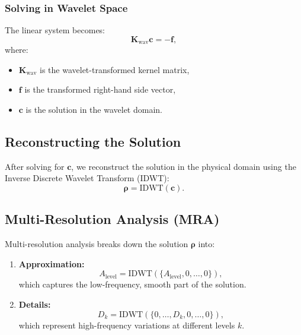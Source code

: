 \documentclass[12pt]{article}
\begin{document}
\subsubsection{Solving in Wavelet Space}
The linear system becomes:
\[
    \mathbf{K}_\text{wav} \mathbf{c} = -\mathbf{f},
\]
where:
\begin{itemize}
    \item \(\mathbf{K}_\text{wav}\) is the wavelet-transformed kernel matrix,
    \item \(\mathbf{f}\) is the transformed right-hand side vector,
    \item \(\mathbf{c}\) is the solution in the wavelet domain.
\end{itemize}

\subsection{Reconstructing the Solution}
After solving for \(\mathbf{c}\), we reconstruct the solution in the physical domain using the Inverse Discrete Wavelet Transform (IDWT):
\[
    \boldsymbol{\rho} = \text{IDWT}(\mathbf{c}).
\]

\subsection{Multi-Resolution Analysis (MRA)}
Multi-resolution analysis breaks down the solution \(\boldsymbol{\rho}\) into:
\begin{enumerate}
    \item \textbf{Approximation:}
          \[
              A_\text{level} = \text{IDWT}(\{A_\text{level}, 0, \dots, 0\}),
          \]
          which captures the low-frequency, smooth part of the solution.
    \item \textbf{Details:}
          \[
              D_k = \text{IDWT}(\{0, \dots, D_k, 0, \dots, 0\}),
          \]
          which represent high-frequency variations at different levels \(k\).
\end{enumerate}
\end{document}

